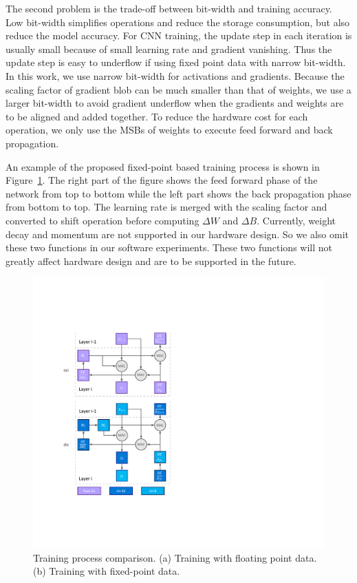 The second problem is the trade-off between bit-width and training accuracy. Low bit-width simplifies operations and reduce the storage consumption, but also reduce the model accuracy. For CNN training, the update step in each iteration is usually small because of small learning rate and gradient vanishing. Thus the update step is easy to underflow if using fixed point data with narrow bit-width.  In this work, we use narrow bit-width for activations and gradients. Because the scaling factor of gradient blob can be much smaller than that of weights, we use a larger bit-width to avoid gradient underflow when the gradients and weights are to be aligned and added together. To reduce the hardware cost for each operation, we only use the MSBs of weights to execute feed forward and back propagation.

An example of the proposed fixed-point based training process is shown in Figure~\ref{fig:train_fixed}. The right part of the figure shows the feed forward phase of the network from top to bottom while the left part shows the back propagation phase from bottom to top. The learning rate is merged with the scaling factor and converted to shift operation before computing $\Delta W$ and $\Delta B$. Currently, weight decay and momentum are not supported in our hardware design. So we also omit these two functions in our software experiments. These two functions will not greatly affect hardware design and are to be supported in the future.

\begin{figure}[tb]
  \centering 
  \includegraphics[width=1.0\columnwidth]{figures/fixed_train.pdf}
  \caption{Training process comparison. (a) Training with floating point data. (b) Training with fixed-point data. }
  \label{fig:train_fixed}
\end{figure}

